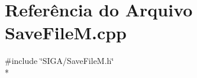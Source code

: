 \section{Referência do Arquivo Save\+File\+M.\+cpp}
\label{_save_file_m_8cpp}
{\ttfamily \#include \char`\"{}S\+I\+G\+A/\+Save\+File\+M.\+h\char`\"{}}\\*
